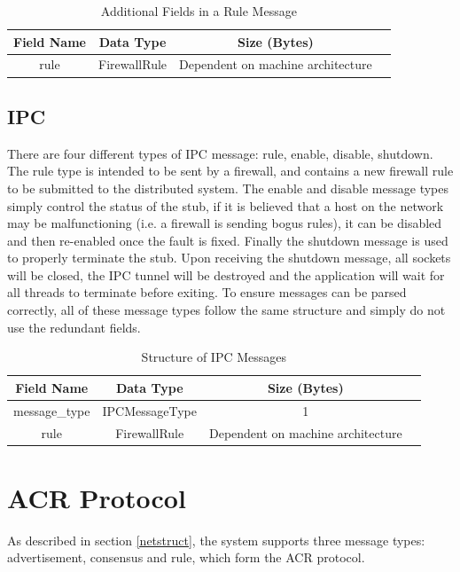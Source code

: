 \documentclass[a4paper, 11pt]{report}
\begin{document}
\begin{table}[H]
\centering
\begin{tabular}{ |c|c|c|c| } 
\hline
Field Name & Data Type & Size (Bytes) \\
\hline
rule & FirewallRule & Dependent on machine architecture \\ 
\hline
\end{tabular}
\caption{Additional Fields in a Rule Message}
\label{tab:rule}
\end{table}

\subsection{IPC}
There are four different types of \acrshort{IPC} message: rule, enable, disable, shutdown. The rule type is intended to be sent by a firewall, and contains a new firewall rule to be submitted to the distributed system. The enable and disable message types simply control the status of the stub, if it is believed that a host on the network may be malfunctioning (i.e. a firewall is sending bogus rules), it can be disabled and then re-enabled once the fault is fixed. Finally the shutdown message is used to properly terminate the \gls{stub}. Upon receiving the shutdown message, all sockets will be closed, the \acrshort{IPC} tunnel will be destroyed and the application will wait for all threads to terminate before exiting.
To ensure messages can be parsed correctly, all of these message types follow the same structure and simply do not use the redundant fields.

\begin{table}[H]
\centering
\begin{tabular}{ |c|c|c|c| } 
\hline
Field Name & Data Type & Size (Bytes) \\
\hline
message_type & IPCMessageType & 1 \\
rule & FirewallRule & Dependent on machine architecture \\
\hline
\end{tabular}
\caption{Structure of \acrshort{IPC} Messages}
\label{tab:ipc}
\end{table}
 
\section{ACR Protocol}
As described in section \ref{netstruct}, the system supports three message types: advertisement, consensus and rule, which form the ACR protocol.
\end{document}
